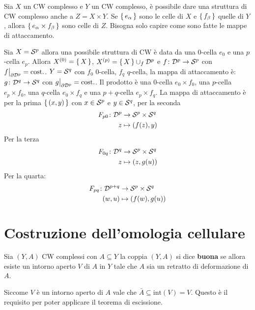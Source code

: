 Sia $ X $ un CW complesso e $ Y $ un CW complesso, è
possibile dare una struttura di CW complesso anche a $ Z = X \times Y  $.
Se $ \set{e_\alpha} $ sono le celle di $ X $ e $ \set{f_\beta} $
quelle di $ Y $, allora $ \set{e_\alpha \times f_\beta} $ sono
celle di $ Z $. Bisogna solo capire come sono fatte le
mappe di attaccamento.

\begin{example}[Sfere]
  Sia $ X = \mathcal{S}^{p} $ allora una possibile struttura di CW
  è data da una $ 0 $-cella $ e_0 $ e una $ p $-cella $ e_p $.
  Allora $ X^{(0)} = \set{X} $, $ X^{(p)} = \set{X} \cup_f \mathcal{D}^{p} $
  e $ f \colon \mathcal{D}^{p} \to \mathcal{S}^{p} $ con $ f \big \vert_{\partial \mathcal{D}^{p}} = \mathrm{cost.} $.
  $ Y = \mathcal{S}^{q} $ con $ f_0 $ $ 0 $-cella, $ f_q $ $ q $-cella,
  la mappa di attaccamento è: $ g \colon \mathcal{D}^{q} \to \mathcal{S}^{q} $ con $ g \big \vert_{\partial \mathcal{D}^{p}} = \mathrm{cost.} $.
  Il prodotto è una $ 0 $-cella $ e_0 \times f_0 $, una $ p $-cella
  $ e_p \times f_0 $, una $ q $-cella $ e_0 \times f_q $ e una $ p + q $-cella
  $ e_p \times f_q $. La mappa di attaccamento è per la prima
  $ \set{(x,y)} $ con $ x \in \mathcal{S}^{p} $ e $ y \in \mathcal{S}^{q} $,
  per la seconda
  \begin{align*}
    F_{p0} \colon \mathcal{D}^{p} & \to \mathcal{S}^{p} \times \mathcal{S}^{q} \\
    z & \mapsto (f(z), y)
  \end{align*}
  Per la terza
  \begin{align*}
    F_{0q} \colon \mathcal{D}^{q} & \to \mathcal{S}^{p} \times \mathcal{S}^{q} \\
    z & \mapsto (z, g(u))
  \end{align*}
  Per la quarta:
  \begin{align*}
    F_{pq} \colon \mathcal{D}^{p+q} & \to \mathcal{S}^{p} \times \mathcal{S}^{q} \\
    (w,u) & \mapsto (f(w), g(u))
  \end{align*}
\end{example}




\section{Costruzione dell'omologia cellulare}

\begin{definition}
  Sia $ (Y,A) $ CW complessi con $ A \subseteq Y $
  la coppia $ (Y,A) $ si dice \textbf{buona} se
  allora esiste un intorno aperto $ V $ di $ A $ in $ Y $ tale che $ A $
  sia un retratto di deformazione di $ A $.
\end{definition}
\begin{osservation}
  Siccome $ V $ è un intorno aperto di $ A $ vale
  che $ \bar{A} \subseteq \mathrm{int}(V) = V $. Questo è il requisito per poter
  applicare il teorema di escissione.
\end{osservation}

